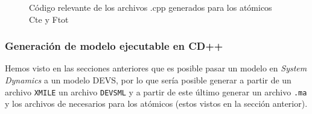 \begin{figure}[!h]
\centering     %
{}
\caption{Código relevante de los archivos .cpp generados para los atómicos Cte y Ftot}
\end{figure}

\subsubsection{Generación de modelo ejecutable en CD++}
Hemos visto en las secciones anteriores que es posible pasar un modelo en \textit{System Dynamics} a un modelo DEVS, por lo que sería posible generar a partir de un archivo \texttt{XMILE} un archivo \texttt{DEVSML} y a partir de este último generar un archivo \texttt{.ma} y los archivos de necesarios para los atómicos (estos vistos en la sección anterior).

